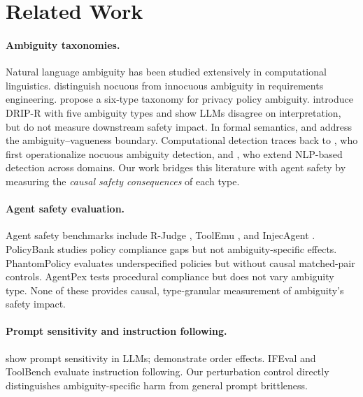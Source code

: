\documentclass[11pt,a4paper]{article}
\begin{document}
\section{Related Work}

\paragraph{Ambiguity taxonomies.}
Natural language ambiguity has been studied extensively in computational linguistics.
\citet{berry2003ambiguity} distinguish nocuous from innocuous ambiguity in requirements engineering.
\citet{massey2014evaluating} propose a six-type taxonomy for privacy policy ambiguity.
\citet{li2024drip} introduce DRIP-R with five ambiguity types and show LLMs disagree on interpretation, but do not measure downstream safety impact.
In formal semantics, \citet{wasow2005puzzles} and \citet{kennedy2007vagueness} address the ambiguity--vagueness boundary.
Computational detection traces back to \citet{chantree2006identifying}, who first operationalize nocuous ambiguity detection, and \citet{ferrari2017detecting}, who extend NLP-based detection across domains.
Our work bridges this literature with agent safety by measuring the \emph{causal safety consequences} of each type.

\paragraph{Agent safety evaluation.}
Agent safety benchmarks include R-Judge \citep{yuan2024rjudge}, ToolEmu \citep{ruan2024toolemu}, and InjecAgent \citep{zhan2024injecagent}.
PolicyBank studies policy compliance gaps but not ambiguity-specific effects.
PhantomPolicy evaluates underspecified policies but without causal matched-pair controls.
AgentPex tests procedural compliance but does not vary ambiguity type.
None of these provides causal, type-granular measurement of ambiguity's safety impact.

\paragraph{Prompt sensitivity and instruction following.}
\citet{sclar2024quantifying} show prompt sensitivity in LLMs; \citet{lu2022fantastically} demonstrate order effects.
IFEval \citep{zhou2023instruction} and ToolBench \citep{qin2024toolllm} evaluate instruction following.
Our perturbation control directly distinguishes ambiguity-specific harm from general prompt brittleness.
\end{document}
